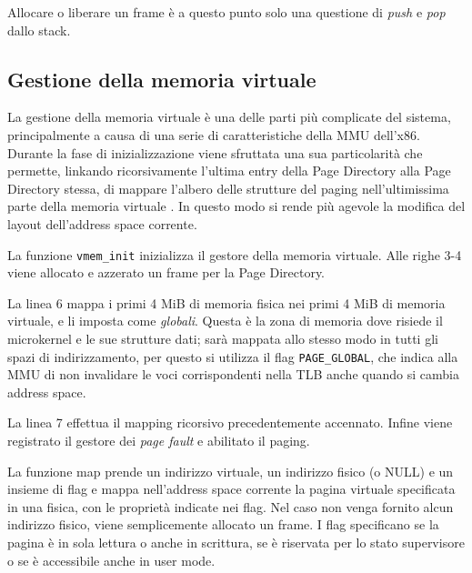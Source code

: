 \documentclass[12pt,a4paper]{report}
\begin{document}
			Allocare o liberare un frame è a questo punto solo una questione di \emph{push} e \emph{pop} dallo stack.
			
		\subsection{Gestione della memoria virtuale}
			La gestione della memoria virtuale è una delle parti più complicate del sistema, principalmente
			a causa di una serie di caratteristiche della MMU dell'x86.
			Durante la fase di inizializzazione viene sfruttata una sua particolarità che permette,
			linkando ricorsivamente l'ultima entry della Page Directory alla Page Directory stessa,
			di mappare l'albero delle strutture del paging nell'ultimissima parte della memoria
			virtuale \cite{OSDEV_MMU}.
			In questo modo si rende più agevole la modifica del layout dell'address space corrente.
			
			
			
			La funzione \texttt{vmem\_init} inizializza il gestore della memoria virtuale.
			Alle righe 3-4 viene allocato e azzerato un frame per la Page Directory.
			
			La linea 6 mappa i primi 4 MiB di memoria fisica nei primi 4 MiB di memoria virtuale, e li imposta come \emph{globali}.
			Questa è la zona di memoria dove risiede il microkernel e le sue strutture dati; sarà mappata allo stesso modo in tutti
			gli spazi di indirizzamento, per questo si utilizza il flag \texttt{PAGE\_GLOBAL}, che indica alla MMU di non invalidare le voci
			corrispondenti nella TLB anche quando si cambia address space.
			
			La linea 7 effettua il mapping ricorsivo precedentemente accennato.
			Infine viene registrato il gestore dei \emph{page fault} e abilitato il paging.
			
			
			
			La funzione map prende un indirizzo virtuale, un indirizzo fisico (o NULL) e un insieme di flag
			e mappa nell'address space corrente la pagina virtuale specificata in una fisica, con le proprietà
			indicate nei flag.
			Nel caso non venga fornito alcun indirizzo fisico, viene semplicemente allocato un frame.
			I flag specificano se la pagina è in sola lettura o anche in scrittura, se è
			riservata per lo stato supervisore o se è accessibile anche in user mode.
			
\end{document}
